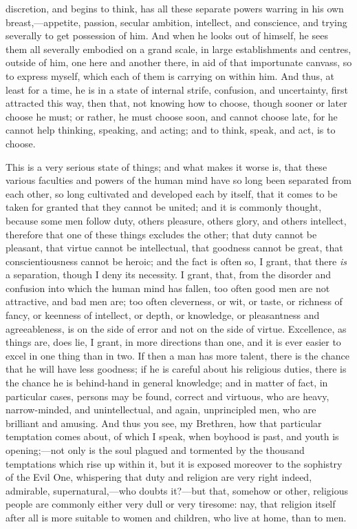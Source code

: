 discretion, and begins to think, has all these separate
powers warring in his own breast,—appetite, passion,
secular ambition, intellect, and conscience, and trying
severally to get possession of him. And when he looks out
of himself, he sees them all severally embodied on a
grand scale, in large establishments and centres, outside
of him, one here and another there, in aid of that
importunate canvass, so to express myself, which each of
them is carrying on within him. And thus, at least for a
time, he is in a state of internal strife, confusion, and
uncertainty, first attracted this way, then that, not
knowing how to choose, though sooner or later choose he
must; or rather, he must choose soon, and cannot choose
late, for he cannot help thinking, speaking, and acting;
and to think, speak, and act, is to choose.

This is a very serious state of things; and what makes
it worse is, that these various faculties and powers of
the human mind have so long been separated from each
other, so long cultivated and developed each by itself,
that it comes to be taken for granted that they cannot be
united; and it is commonly thought, because some men
follow duty, others pleasure, others glory, and others
intellect, therefore that one of these things excludes
the other; that duty cannot be pleasant, that virtue
cannot be intellectual, that goodness cannot be great,
that conscientiousness cannot be heroic; and the fact is
often so, I grant, that there \emph{is} a separation,
though I deny its necessity. I grant, that, from the
disorder and confusion into which the human mind has
fallen, too often good men are not attractive, and bad
men are; too often cleverness, or wit, or taste, or
richness of fancy, or keenness of intellect, or depth, or
knowledge, or pleasantness and agreeableness, is on the
side of error and not on the side of virtue. Excellence,
as things are, does lie, I grant, in more directions than
one, and it is ever easier to excel in one thing than in
two. If then a man has more talent, there is the chance
that he will have less goodness; if he is careful about
his religious duties, there is the chance he is
behind-hand in general knowledge; and in matter of fact,
in particular cases, persons may be found, correct and
virtuous, who are heavy, narrow-minded, and
unintellectual, and again, unprincipled men, who are
brilliant and amusing. And thus you see, my Brethren, how
that particular temptation comes about, of which I speak,
when boyhood is past, and youth is opening;—not only
is the soul plagued and tormented by the thousand
temptations which rise up within it, but it is exposed
moreover to the sophistry of the Evil One, whispering
that duty and religion are very right indeed, admirable,
supernatural,—who doubts it?—but that, somehow
or other, religious people are commonly either very dull
or very tiresome: nay, that religion itself after all is
more suitable to women and children, who live at home,
than to men.

